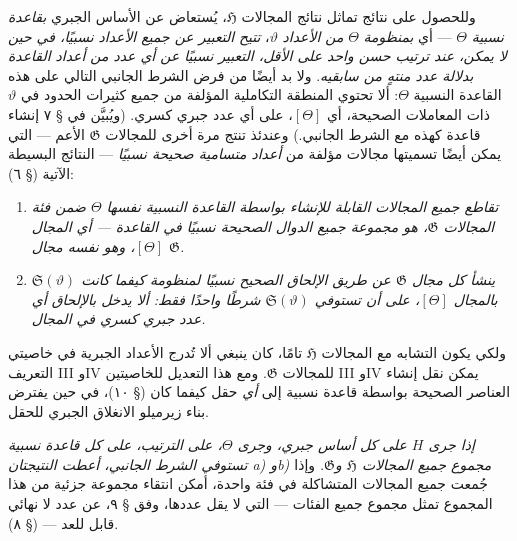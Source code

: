 \documentclass[11pt]{article}
\begin{document}
وللحصول على نتائج تماثل نتائج المجالات $\mathfrak H$، يُستعاض عن الأساس
الجبري \emph{بقاعدة نسبية} $\Theta$ --- أي \emph{بمنظومة} $\Theta$
\emph{من الأعداد} $\vartheta$، \emph{تتيح التعبير عن جميع الأعداد نسبيًا،
في حين لا يمكن، عند ترتيب حسن واحد على الأقل، التعبير نسبيًا عن أي عدد من
أعداد القاعدة بدلالة عدد منتهٍ من سابقيه}. ولا بد أيضًا من فرض الشرط الجانبي
التالي على هذه القاعدة النسبية $\Theta$: ألا تحتوي المنطقة التكاملية
المؤلفة من جميع كثيرات الحدود في $\vartheta$ ذات المعاملات الصحيحة، أي
$[\Theta]$، على أي عدد جبري كسري. (ويُبيَّن في § ٧ إنشاء قاعدة كهذه مع الشرط
الجانبي.) وعندئذ تنتج مرة أخرى للمجالات $\mathfrak G$ الأعم --- التي يمكن
أيضًا تسميتها مجالات مؤلفة من \emph{أعداد متسامية صحيحة نسبيًا} --- النتائج
البسيطة الآتية (§ ٦):
\begin{enumerate}
\item[a)] \emph{تقاطع جميع المجالات القابلة للإنشاء بواسطة القاعدة النسبية
نفسها $\Theta$ ضمن فئة المجالات $\mathfrak G$، هو مجموعة جميع الدوال الصحيحة نسبيًا في
القاعدة --- أي المجال $[\Theta]$، وهو نفسه مجال $\mathfrak G$.}
\item[b)] \emph{ينشأ كل مجال $\mathfrak G$ عن طريق الإلحاق الصحيح نسبيًا
لمنظومة كيفما كانت $\mathfrak S(\vartheta)$ بالمجال $[\Theta]$، على أن
تستوفي $\mathfrak S(\vartheta)$ شرطًا واحدًا فقط: ألا يدخل بالإلحاق أي عدد
جبري كسري في المجال.}
\end{enumerate}

ولكي يكون التشابه مع المجالات $\mathfrak H$ تامًا، كان ينبغي ألا تُدرج
الأعداد الجبرية في خاصيتي التعريف III وIV للمجالات $\mathfrak G$. ومع هذا
التعديل للخاصيتين III وIV يمكن نقل إنشاء العناصر الصحيحة بواسطة قاعدة نسبية
إلى \emph{أي} حقل كيفما كان (§ ١٠)، في حين يفترض بناء زيرميلو الانغلاق الجبري
للحقل.

\emph{إذا جرى $H$ على كل أساس جبري، وجرى $\Theta$، على الترتيب، على كل
قاعدة نسبية تستوفي الشرط الجانبي، أعطت النتيجتان a) وb) مجموع جميع المجالات
$\mathfrak H$ و$\mathfrak G$.} وإذا جُمعت جميع المجالات المتشاكلة في فئة
واحدة، أمكن انتقاء مجموعة جزئية من هذا المجموع تمثل مجموع جميع الفئات ---
التي لا يقل عددها، وفق § ٩، عن عدد لا نهائي قابل للعد --- (§ ٨).



\clearpage
\end{document}
